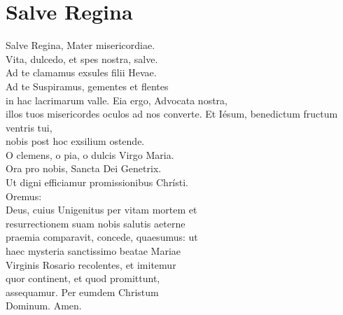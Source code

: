 \documentclass[paper=a5,pagesize=pdftex,fontsize=10pt,headinclude=on,twoside=off]{scrbook}
\begin{document}
\section{Salve Regina}
\begin{scripture}
  \begin{poetry}
    Salve Regina, Mater misericordiae.\\
    Vita, dulcedo, et spes nostra, salve.\\
    Ad te clamamus exsules filii Hevae.\\
    Ad te Suspiramus, gementes et flentes\\
    in hac lacrimarum valle.
    Eia ergo, Advocata nostra, \\
    illos tuos misericordes oculos ad nos converte.
    Et Iésum, benedictum fructum ventris tui, \\
    nobis post hoc exsilium ostende.\\
    O clemens, o pia, o dulcis Virgo Maria.\\
    Ora pro nobis, Sancta Dei Genetrix.\\
    Ut digni efficiamur promissionibus Chrísti.\\
    Oremus:\\
    Deus, cuius Unigenitus per vitam mortem et\\
    resurrectionem suam nobis salutis aeterne\\
    praemia comparavit, concede, quaesumus: ut\\
    haec mysteria sanctissimo beatae Mariae\\
    Virginis Rosario recolentes, et imitemur\\
    quor continent, et quod promittunt,\\
    assequamur. Per eumdem Christum\\
    Dominum. Amen.\\
  \end{poetry}
\end{scripture}

\end{document}

